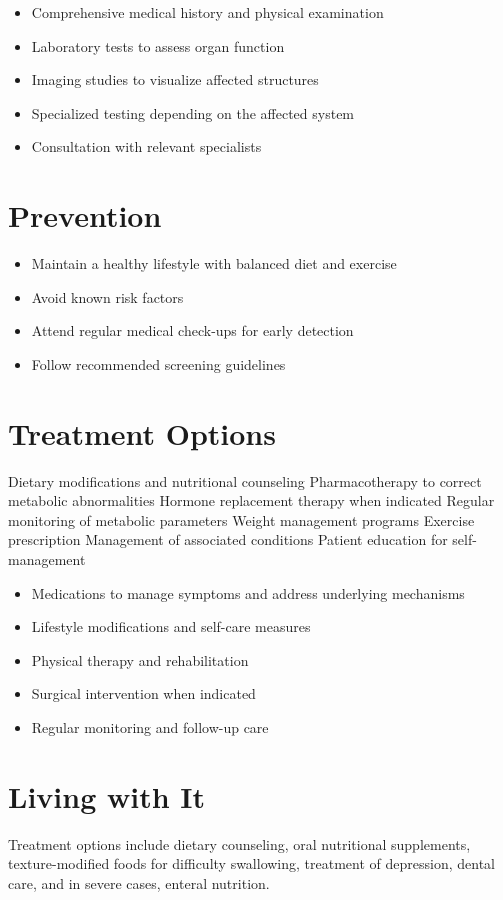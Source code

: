 \begin{itemize}[noitemsep]
  \item Comprehensive medical history and physical examination
  \item Laboratory tests to assess organ function
  \item Imaging studies to visualize affected structures
  \item Specialized testing depending on the affected system
  \item Consultation with relevant specialists
\end{itemize}
\section{Prevention}
\begin{itemize}[noitemsep]
  \item Maintain a healthy lifestyle with balanced diet and exercise
  \item Avoid known risk factors
  \item Attend regular medical check-ups for early detection
  \item Follow recommended screening guidelines
\end{itemize}
\section{Treatment Options}
Dietary modifications and nutritional counseling Pharmacotherapy to correct metabolic abnormalities Hormone replacement therapy when indicated Regular monitoring of metabolic parameters Weight management programs Exercise prescription Management of associated conditions Patient education for self-management

\begin{itemize}[noitemsep]
  \item Medications to manage symptoms and address underlying mechanisms
  \item Lifestyle modifications and self-care measures
  \item Physical therapy and rehabilitation
  \item Surgical intervention when indicated
  \item Regular monitoring and follow-up care
\end{itemize}
\section{Living with It}
Treatment options include dietary counseling, oral nutritional supplements, texture-modified foods for difficulty swallowing, treatment of depression, dental care, and in severe cases, enteral nutrition.

